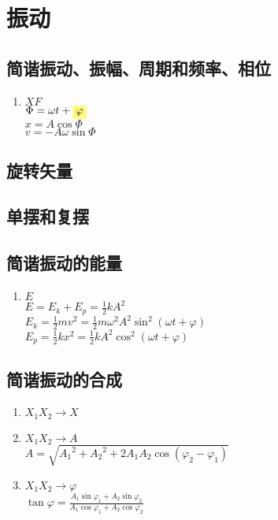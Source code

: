 \documentclass[UTF8,a4paper,12pt,scheme=chinese]{ctexart}
\newcommand{\hla}[1]{%
	\colorbox{yellow!50}{$\displaystyle#1$}}
\begin{document}
	\section{振动}
	\subsection{简谐振动、振幅、周期和频率、相位}
	\begin{enumerate}
		\item $XF$\\
		$\Phi = \omega t+\hla{\varphi}$\\
		$x=A\cos\Phi$\\
		$v=-A\omega\sin\Phi$
		
	\end{enumerate}
	\subsection{旋转矢量}
	\subsection{单摆和复摆}
	\subsection{简谐振动的能量}
	\begin{enumerate}
		\item $E$\\
		$E=E_k+E_p=\frac{1}{2}kA^2$\\
		$\displaystyle
		E_k=\frac{1}{2}mv^2=\frac{1}{2}m\omega^2A^2\sin^2(\omega t+\varphi)$\\
		$\displaystyle
		E_p=\frac{1}{2}kx^2=\frac{1}{2}kA^2\cos^2(\omega t+\varphi)$
	\end{enumerate}
	
	\subsection{简谐振动的合成}
	\begin{enumerate}
		\item $X_1X_2\rightarrow X$
		\item $X_1X_2\rightarrow A$\\
		$A=\sqrt{{A_1}^2+{A_2}^2+2A_1A_2\cos(\varphi_2-\varphi_1)}$
		\item $X_1X_2\rightarrow \varphi$\\
		$\displaystyle
		\tan \varphi=\frac{A_1\sin\varphi_1+A_2\sin\varphi_2}{A_1\cos\varphi_1+A_2\cos\varphi_2}$
		
	\end{enumerate}
	\newpage
\end{document}
